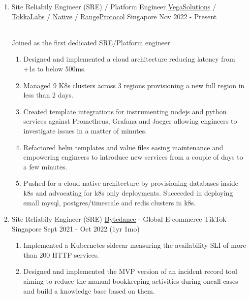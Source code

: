 \documentclass{CVSoftwareEngineer}
\begin{document}
	\begin{enumerate}[labelwidth=!, labelindent=0pt, leftmargin=*, rightmargin=15pt]

		\item[] \cvExperience
			{Site Reliabily Engineer (SRE) / Platform Engineer}
			{\href{https://vegasolutions.co}{VegaSolutions} / \href{https://tokkalabs.com}{TokkaLabs} / \href{https://native.org/}{Native} / \href{https://www.rangeprotocol.com/}{RangeProtocol}}
			{Singapore}
			{Nov 2022 - Present}
			{
				\\ Joined as the first dedicated SRE/Platform engineer
				\begin{enumerate}[labelwidth=!, labelindent=0pt, nosep, leftmargin=*]
					\item[\textasteriskcentered] Designed and implemented a cloud architecture reducing
						latency from +1s to below 500ms.
					\item[\textasteriskcentered] Managed 9 K8s clusters across 3 regions provisioning a new full region in less than 2 days.
					\item[\textasteriskcentered] Created template integrations for instrumenting nodejs and python services
						against Prometheus, Grafana and Jaeger allowing engineers to investigate issues in a matter of minutes.
					\item[\textasteriskcentered] Refactored helm templates and value files easing maintenance and empowering
						engineers to introduce new services from a couple of days to a few minutes.
						\item[\textasteriskcentered] Pushed for a cloud native architecture by provisioning databases inside k8s
						and advocating for k8s only deployments. Succeeded in deploying small mysql, postgres/timescale and redis
						clusters in k8s.
				\end{enumerate}
			}

		\item[] \cvExperience
			{Site Reliabily Engineer (SRE)}
			{\href{https://www.bytedance.com/en}{Bytedance} - Global E-commerce TikTok}
			{Singapore}
			{Sept 2021 - Oct 2022 (1yr 1mo)}
			{
				\begin{enumerate}[labelwidth=!, labelindent=0pt, nosep, leftmargin=*]
					\item[\textasteriskcentered] Implemented a Kubernetes sidecar measuring the availability SLI of more than 200 HTTP services.
					\item[\textasteriskcentered] Designed and implemented the MVP version of an incident record tool aiming to reduce the manual bookkeeping activities during oncall cases and build a knowledge base based on them.
				\end{enumerate}
			}


\end{enumerate}
\end{document}

